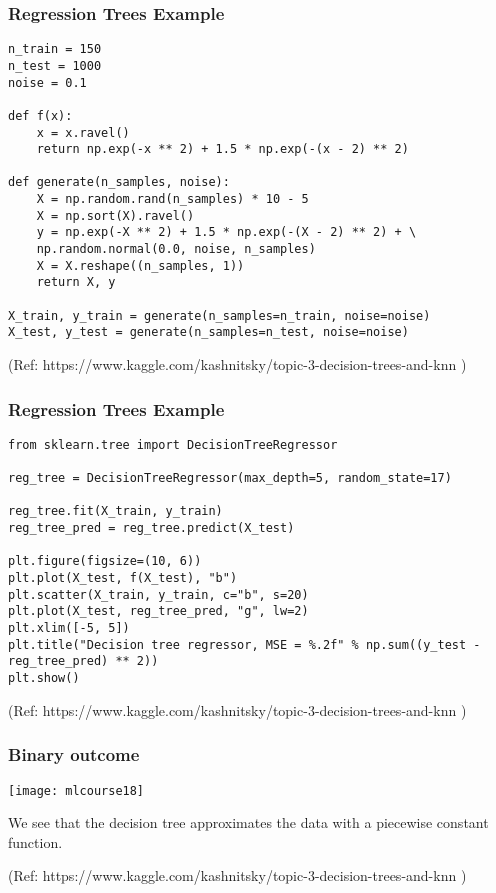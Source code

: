 \begin{frame}[fragile]\frametitle{Regression Trees Example}
\begin{lstlisting}
n_train = 150        
n_test = 1000       
noise = 0.1

def f(x):
    x = x.ravel()
    return np.exp(-x ** 2) + 1.5 * np.exp(-(x - 2) ** 2)

def generate(n_samples, noise):
    X = np.random.rand(n_samples) * 10 - 5
    X = np.sort(X).ravel()
    y = np.exp(-X ** 2) + 1.5 * np.exp(-(X - 2) ** 2) + \
    np.random.normal(0.0, noise, n_samples)
    X = X.reshape((n_samples, 1))
    return X, y

X_train, y_train = generate(n_samples=n_train, noise=noise)
X_test, y_test = generate(n_samples=n_test, noise=noise)
\end{lstlisting}

{\tiny (Ref: https://www.kaggle.com/kashnitsky/topic-3-decision-trees-and-knn )}

\end{frame}

\begin{frame}[fragile]\frametitle{Regression Trees Example}
\begin{lstlisting}
from sklearn.tree import DecisionTreeRegressor

reg_tree = DecisionTreeRegressor(max_depth=5, random_state=17)

reg_tree.fit(X_train, y_train)
reg_tree_pred = reg_tree.predict(X_test)

plt.figure(figsize=(10, 6))
plt.plot(X_test, f(X_test), "b")
plt.scatter(X_train, y_train, c="b", s=20)
plt.plot(X_test, reg_tree_pred, "g", lw=2)
plt.xlim([-5, 5])
plt.title("Decision tree regressor, MSE = %.2f" % np.sum((y_test - reg_tree_pred) ** 2))
plt.show()
\end{lstlisting}

{\tiny (Ref: https://www.kaggle.com/kashnitsky/topic-3-decision-trees-and-knn )}

\end{frame}


\begin{frame}[fragile]\frametitle{Binary outcome}
\begin{center}
\texttt{[image: mlcourse18]}
\end{center}

We see that the decision tree approximates the data with a piecewise constant function.

{\tiny (Ref: https://www.kaggle.com/kashnitsky/topic-3-decision-trees-and-knn )}

\end{frame}






